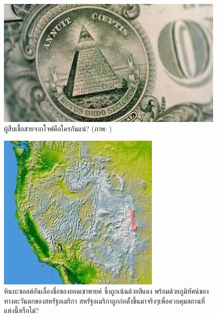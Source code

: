 \documentclass[10pt,twocolumn,letterpaper]{article}
\begin{document}
\begin{figure}[t]
\begin{center}
   \includegraphics[width=1\linewidth]{illuminati.jpg}
\end{center}
   \caption{ผู้สืบเชื้อสายจากโจฟคือใครกันแน่? (ภาพ: \cite{35})}
\label{fig:10}
\label{fig:onecol}
\end{figure}

\begin{figure}[t]
\begin{center}
   \includegraphics[width=1\linewidth]{pike.jpg}
\end{center}
   \caption{หินบะซอลต์อันเลื่องชื่อของยอดเขาพายค์ ซึ่งถูกเน้นด้วยสีแดง พร้อมด้วยภูมิทัศน์ของทางตะวันตกของสหรัฐอเมริกา \cite{36} สหรัฐอเมริกาถูกก่อตั้งขึ้นมาจริงๆเพื่อควบคุมสถานที่แห่งนี้หรือไม่?}
\label{fig:11}
\label{fig:onecol}
\end{figure}
\end{document}
